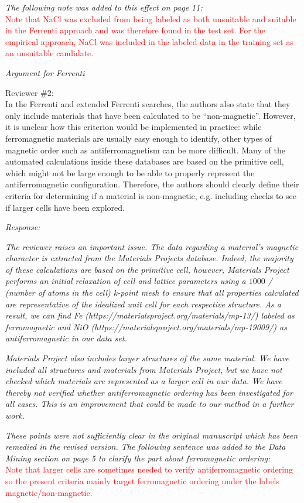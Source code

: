 \documentclass[11pt, a4paper]{letter} %
\newcommand{\mrk}[1]{\textcolor{red}{#1}}
\begin{document}
\textit{The following note was added to this effect on page 11:} \\ 
\mrk{Note that NaCl was excluded from being labeled as both unsuitable and suitable in the Ferrenti approach and was therefore found in the test set. For the empirical approach, NaCl was included in the labeled data in the training set as an unsuitable candidate. }


\textit{Argument for Ferrenti}  

Reviewer \#2: \\
In the Ferrenti and extended Ferrenti searches, the authors also state that they only include materials that have been calculated to be “non-magnetic”. However, it is unclear how this criterion would be implemented in practice: while ferromagnetic materials are usually easy enough to identify, other types of magnetic order such as antiferromagnetism can be more difficult. Many of the automated calculations inside these databases are based on the primitive cell, which might not be large enough to be able to properly represent the antiferromagnetic configuration. Therefore, the authors should clearly define their criteria for determining if a material is non-magnetic, e.g. including checks to see if larger cells have been explored.

\textit{Response:}

\textit{The reviewer raises an important issue. 
The data regarding a material's magnetic character is extracted from the Materials Projects database. Indeed, the majority of these calculations are based on the primitive cell, however, Materials Project performs an initial relaxation of cell and lattice parameters using a $1000$ / (number of atoms in the cell) k-point mesh to ensure that all properties calculated are representative of the idealized unit cell for each respective structure. As a result, we can find Fe (https://materialsproject.org/materials/mp-13/) labeled as ferromagnetic and NiO (https://materialsproject.org/materials/mp-19009/) as antiferromagnetic in our data set.} 

\textit{Materials Project also includes larger structures of the same material. We have included all structures and materials from Materials Project, but we have not checked which materials are represented as a larger cell in our data. We have thereby not verified whether antiferromagnetic ordering has been investigated for all cases. This is an improvement that could be made to our method in a further work.}

\textit{These points were not sufficiently clear in the original manuscript which has been remedied in the revised version. The following sentence was added to the Data Mining section on page 5 to clarify the part about ferromagnetic ordering: } \\
\mrk{Note that larger cells are sometimes needed to verify antiferromagnetic ordering so the present criteria mainly target ferromagnetic ordering under the labels magnetic/non-magnetic.} 
\end{document}

